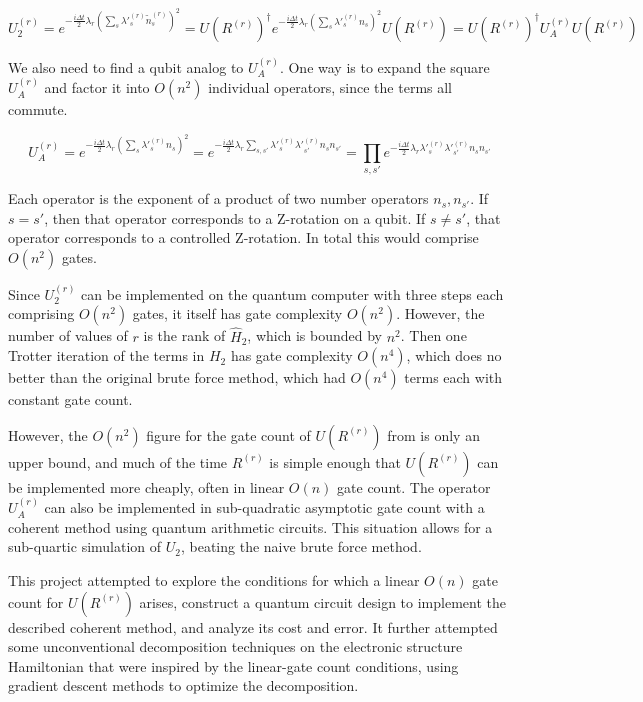 \begin{equation}
    U_2^{(r)} = e^{-\frac{i\Delta t}{2}\lambda_r\left(\sum_s \lambda'^{(r)}_s \tilde{n}^{(r)}_s\right)^2} = U(R^{(r)})^\dag e^{-\frac{i\Delta t}{2}\lambda_r\left(\sum_s \lambda'^{(r)}_s n_s\right)^2}U(R^{(r)}) = U(R^{(r)})^\dag U_A^{(r)}U(R^{(r)})
\end{equation}

We also need to find a qubit analog to $U_A^{(r)}$. One way is to expand the square $U_A^{(r)}$ and factor it into $O(n^2)$ individual operators, since the terms all commute.

\begin{equation}
    U_A^{(r)} = e^{-\frac{i\Delta t}{2}\lambda_r\left(\sum_s \lambda'^{(r)}_s n_s\right)^2} = e^{-\frac{i\Delta t}{2}\lambda_r\sum_{s, s'} \lambda'^{(r)}_s\lambda'^{(r)}_{s'} n_sn_{s'}} = \prod_{s, s'} e^{-\frac{i\Delta t}{2}\lambda_r\lambda'^{(r)}_s\lambda'^{(r)}_{s'} n_sn_{s'}}
    \label{eq: brute}
\end{equation}

Each operator is the exponent of a product of two number operators $n_s, n_{s'}$. If $s = s'$, then that operator corresponds to a Z-rotation on a qubit. If $s \neq s'$, that operator corresponds to a controlled Z-rotation. In total this would comprise $O(n^2)$ gates.

Since $U_2^{(r)}$ can be implemented on the quantum computer with three steps each comprising $O(n^2)$ gates, it itself has gate complexity $O(n^2)$. However, the number of values of $r$ is the rank of $\hat{H}_2$, which is bounded by $n^2$. Then one Trotter iteration of the terms in $H_2$ has gate complexity $O(n^4)$, which does no better than the original brute force method, which had $O(n^4)$ terms each with constant gate count.

However, the $O(n^2)$ figure for the gate count of $U(R^{(r)})$ from \cite{FSN} is only an upper bound, and much of the time $R^{(r)}$ is simple enough that $U(R^{(r)})$ can be implemented more cheaply, often in linear $O(n)$ gate count. The operator $U_A^{(r)}$ can also be implemented in sub-quadratic asymptotic gate count with a coherent method using quantum arithmetic circuits. This situation allows for a sub-quartic simulation of $U_2$, beating the naive brute force method.

This project attempted to explore the conditions for which a linear $O(n)$ gate count for $U(R^{(r)})$ arises, construct a quantum circuit design to implement the described coherent method, and analyze its cost and error. It further attempted some unconventional decomposition techniques on the electronic structure Hamiltonian that were inspired by the linear-gate count conditions, using gradient descent methods to optimize the decomposition.


